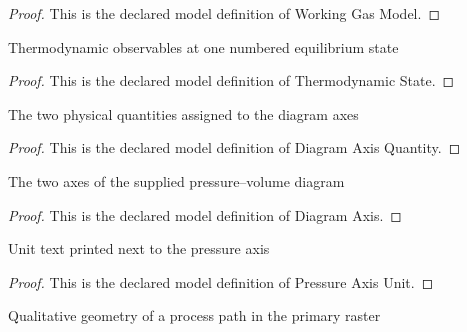 \begin{proof}
  This is the declared model definition of Working Gas Model.
\end{proof}
\begin{definition}
  \label{def:physics:phyx-mini-0437:phyxminiproblems-problemphyxmini0437-thermodynamicstate}
  Thermodynamic observables at one numbered equilibrium state
\end{definition}
\begin{proof}
  This is the declared model definition of Thermodynamic State.
\end{proof}
\begin{definition}
  \label{def:physics:phyx-mini-0437:phyxminiproblems-problemphyxmini0437-diagramaxisquantity}
  The two physical quantities assigned to the diagram axes
\end{definition}
\begin{proof}
  This is the declared model definition of Diagram Axis Quantity.
\end{proof}
\begin{definition}
  \label{def:physics:phyx-mini-0437:phyxminiproblems-problemphyxmini0437-diagramaxis}
  The two axes of the supplied pressure--volume diagram
\end{definition}
\begin{proof}
  This is the declared model definition of Diagram Axis.
\end{proof}
\begin{definition}
  \label{def:physics:phyx-mini-0437:phyxminiproblems-problemphyxmini0437-pressureaxisunit}
  Unit text printed next to the pressure axis
\end{definition}
\begin{proof}
  This is the declared model definition of Pressure Axis Unit.
\end{proof}
\begin{definition}
  \label{def:physics:phyx-mini-0437:phyxminiproblems-problemphyxmini0437-pathshape}
  Qualitative geometry of a process path in the primary raster
\end{definition}

